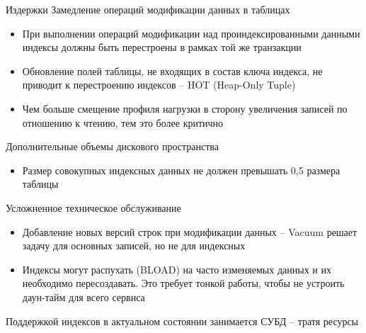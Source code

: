 \documentclass[12pt]{article}
\begin{document}
\begin{Remark}{Издержки}
    Замедление операций модификации данных в таблицах
    
    \begin{itemize}
        \item При выполнении операций модификации над проиндексированными данными индексы должны быть перестроены в рамках той же транзакции
        \item Обновление полей таблицы, не входящих в состав ключа индекса, не приводит к перестроению индексов -- HOT (Heap-Only Tuple)
        \item Чем больше смещение профиля нагрузки в сторону увеличения записей по отношению к чтению, тем это более критично 
    \end{itemize} 

    Дополнительные объемы дискового пространства

    \begin{itemize}
        \item Размер совокупных индексных данных не должен превышать 0,5 размера таблицы 
    \end{itemize}

    Усложненное техническое обслуживание 

    \begin{itemize}
        \item Добавление новых версий строк при модификации данных -- Vacuum решает задачу для основных записей, но не для индексных 
        \item Индексы могут распухать (BLOAD) на часто изменяемых данных и их необходимо пересоздавать. Это требует тонкой работы, чтобы не устроить даун-тайм для всего сервиса 
    \end{itemize}

    Поддержкой индексов в актуальном состоянии занимается СУБД -- тратя ресурсы 
\end{Remark}
\end{document}
